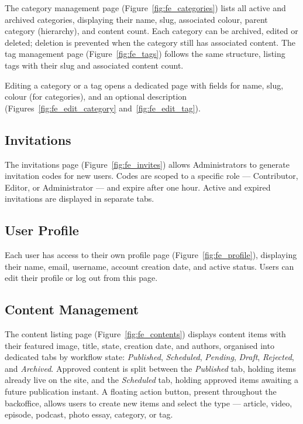 The category management page (Figure~\ref{fig:fe_categories}) lists all active and
archived categories, displaying their name, slug, associated colour, parent category
(hierarchy), and content count. Each category can be archived, edited or deleted;
deletion is prevented when the category still has associated content. The tag
management page (Figure~\ref{fig:fe_tags}) follows the same structure, listing tags
with their slug and associated content count.

Editing a category or a tag opens a dedicated page with fields for name, slug,
colour (for categories), and an optional description
(Figures~\ref{fig:fe_edit_category} and~\ref{fig:fe_edit_tag}).

\subsection{Invitations} \label{sec:fe_invites}

The invitations page (Figure~\ref{fig:fe_invites}) allows Administrators to generate
invitation codes for new users. Codes are scoped to a specific role --- Contributor,
Editor, or Administrator --- and expire after one hour. Active and expired invitations
are displayed in separate tabs.

\subsection{User Profile} \label{sec:fe_profile}

Each user has access to their own profile page (Figure~\ref{fig:fe_profile}),
displaying their name, email, username, account creation date, and active status.
Users can edit their profile or log out from this page.

\subsection{Content Management} \label{sec:fe_content_mgmt}

The content listing page (Figure~\ref{fig:fe_contents}) displays content items with
their featured image, title, state, creation date, and authors, organised into
dedicated tabs by workflow state: \textit{Published}, \textit{Scheduled},
\textit{Pending}, \textit{Draft}, \textit{Rejected}, and \textit{Archived}. Approved
content is split between the \textit{Published} tab, holding items already live on the
site, and the \textit{Scheduled} tab, holding approved items awaiting a future
publication instant. A floating action button, present throughout the backoffice, allows
users to create new items and select the type --- article, video, episode, podcast,
photo essay, category, or tag.

